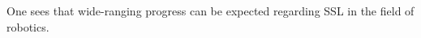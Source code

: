 One sees that wide-ranging progress can be expected regarding \ac{SSL}
in the field of robotics.




